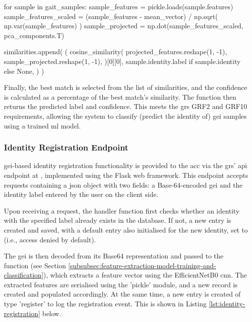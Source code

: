 \begin{code}
for sample in gait_samples:
	sample_features = pickle.loads(sample.features)
	sample_features_scaled = (sample_features - mean_vector) / np.sqrt(
		np.var(sample_features)
	)
	sample_projected = np.dot(sample_features_scaled, pca_components.T)

	similarities.append(
		(
			cosine_similarity(
				projected_features.reshape(1, -1),
				sample_projected.reshape(1, -1),
			)[0][0],
			sample.identity.label if sample.identity else None,
		)
	)
\end{code}
\label{lst:cosine-gei-similarity-comparison} \vspace{10pt}

Finally, the best match is selected from the list of similarities, and the confidence is calculated as a percentage of the best match's similarity.
The function then returns the predicted label and confidence.
This meets the \ac{grs} GRF2 and GRF10 requirements, allowing the system to classify (predict the identity of) \ac{gei} samples using a trained \ac{ml} model.

\subsubsection{Identity Registration Endpoint}
\label{subsec:identity-registration-endpoint}

\ac{gei}-based identity registration functionality is provided to the \ac{acc} via the \ac{grs}' \ac{api} endpoint at , implemented using the Flask web framework.
This endpoint accepts  requests containing a \ac{json} object with two fields: a Base-64-encoded \ac{gei} and the identity label entered by the user on the client side.

Upon receiving a request, the handler function first checks whether an identity with the specified label already exists in the database.
If not, a new  entry is created and saved, with a default  entry also initialised for the new identity, set to  (i.e., access denied by default).

The \ac{gei} is then decoded from its Base64 representation and passed to the  function (see Section \ref{subsubsec:feature-extraction-model-training-and-classification}), which extracts a feature vector using the EfficientNetB0 \ac{cnn}.
The extracted features are serialised using the 'pickle' module, and a new  record is created and populated accordingly.
At the same time, a new  entry is created of type 'register' to log the registration event.
This is shown in Listing \ref{lst:identity-registration} below. 

